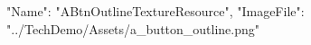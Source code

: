 {
  "Name": "ABtnOutlineTextureResource",
  "ImageFile": "../TechDemo/Assets/a_button_outline.png"
}
